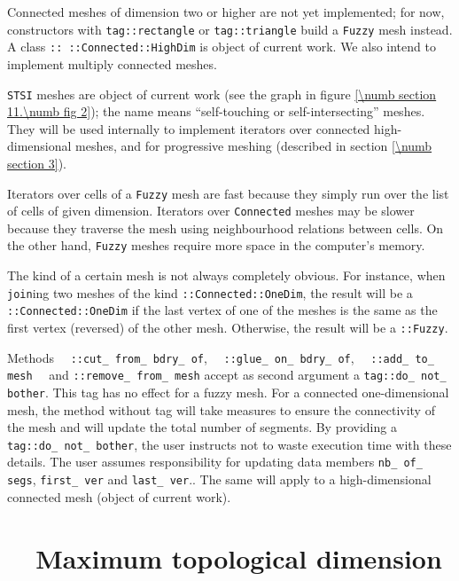 Connected meshes of dimension two or higher are not yet implemented; for now,
{\small\tt{}} constructors with {\small\tt \textcolor{tag}{tag}::rectangle} or
{\small\tt \textcolor{tag}{tag}::triangle} build a {\small\tt Fuzzy} mesh instead.
A class {\small\tt{}:: ::Connected::HighDim} is object of current work.
We also intend to implement multiply connected meshes.

{\small\tt STSI} meshes are object of current work (see the graph in figure
\ref{\numb section 11.\numb fig 2}); the name means ``self-touching or self-intersecting'' meshes.
They will be used internally to implement iterators over connected high-dimensional meshes,
and for progressive meshing (described in section \ref{\numb section 3}).

Iterators over cells of a {\small\tt Fuzzy} mesh are fast because they simply run over the
list of cells of given dimension.
Iterators over {\small\tt Connected} meshes may be slower because they traverse the mesh using
neighbourhood relations between cells.
On the other hand, {\small\tt Fuzzy} meshes require more space in the computer's memory.

The kind of a certain mesh is not always completely obvious.
For instance, when {\small\tt join}ing two meshes of the kind
{\small\tt{}::Connected::OneDim}, the result will be a
{\small\tt{}::Connected::OneDim} if the last vertex of one of the meshes
is the same as the first vertex (reversed) of the other mesh.
Otherwise, the result will be a {\small\tt{}::Fuzzy}.

Methods \ \ {\small\tt{}::cut\_\,from\_\,bdry\_\,of},
\ \ {\small\tt{}::glue\_\,on\_\,bdry\_\,of}, \ \ {\small\tt{}::add\_\,to\_\,mesh}
\ \ and {\small\tt{}::remove\_\,from\_\,mesh}
accept as second argument a {\small\tt\textcolor{tag}{tag}::do\_\,not\_\,bother}.
This tag has no effect for a fuzzy mesh.
For a connected one-dimensional mesh, the method without tag will take measures
to ensure the connectivity of the mesh and will update the total number of segments.
By providing a {\small\tt\textcolor{tag}{tag}::do\_\,not\_\,bother}, the user instructs
{\maniFEM} not to waste execution time with these details.
The user assumes responsibility for updating data members {\small\tt nb\_\,of\_\,segs},
{\small\tt first\_\,ver} and {\small\tt last\_\,ver}..
The same will apply to a high-dimensional connected mesh (object of current work).


\section{~~Maximum topological dimension}\label{\numb section 11.\numb parag 7}

